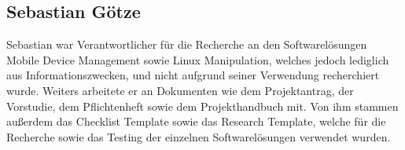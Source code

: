 \subsection{Sebastian Götze}
Sebastian war Verantwortlicher für die Recherche an den Softwarelösungen Mobile Device Management sowie Linux Manipulation, welches jedoch lediglich aus Informationszwecken, und nicht aufgrund seiner Verwendung recherchiert wurde. Weiters arbeitete er an Dokumenten wie dem Projektantrag, der Vorstudie, dem Pflichtenheft sowie dem Projekthandbuch mit. Von ihm stammen außerdem das Checklist Template sowie das Research Template, welche für die Recherche sowie das Testing der einzelnen Softwarelösungen verwendet wurden.


